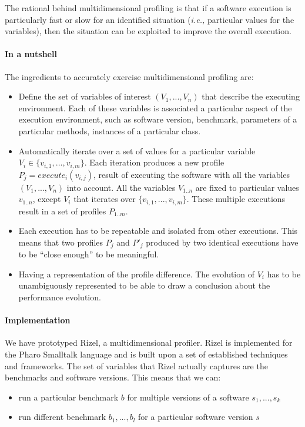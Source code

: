 \documentclass{sig-alternate}
\newcommand{\ie}{\emph{i.e.,}\xspace}
\begin{document}
The rational behind multidimensional profiling is that if a software execution is particularly fast or slow for an identified situation (\ie particular values for the variables), then the situation can be exploited to improve the overall execution.

\paragraph{In a nutshell}

The ingredients to accurately exercise multidimensional profiling are:

\begin{itemize}
\item Define the set of variables of interest $(V_1, ..., V_n)$ that describe the executing environment. Each of these variables is associated a particular aspect of the execution environment, such as software version, benchmark, parameters of a particular methods, instances of a particular class. 

\item Automatically iterate over a set of values for a particular variable $V_i \in \{v_{i,1}, ..., v_{i,m}\}$. Each iteration produces a new profile $P_j = \textit{execute}_i(v_{i,j})$, result of executing the software with all the variables $(V_1, ..., V_n)$ into account. All the variables $V_{1..n}$ are fixed to particular values $v_{1..n}$, except $V_i$ that iterates over $\{v_{i,1}, ..., v_{i,m}\}$. These multiple executions result in a set of profiles $P_{1..m}$. 

\item Each execution has to be repeatable and isolated from other executions. This means that two profiles $P_j$ and $P'_j$ produced by two identical executions have to be ``close enough'' to be meaningful.

\item Having a representation of the profile difference. The evolution of $V_i$ has to be unambiguously represented to be able to draw a conclusion about the performance evolution.
\end{itemize}

\paragraph{Implementation}

We have prototyped Rizel, a multidimensional profiler. Rizel is implemented for the Pharo Smalltalk language and is built upon a set of established techniques and frameworks. The set of variables that Rizel actually captures are the benchmarks and software versions. This means that we can:
\begin{itemize}
\item run a particular benchmark $b$ for multiple versions of a software $s_1, ... , s_k$
\item run different benchmark $b_1, ..., b_l$ for a particular software version $s$
\end{itemize}
\end{document}
